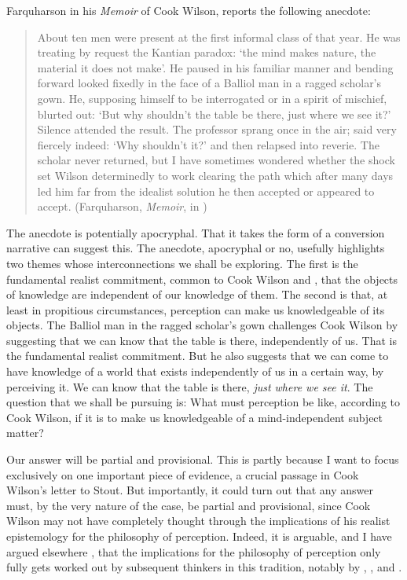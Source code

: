 \documentclass[12pt]{article}
\begin{document}
Farquharson in his \emph{Memoir} of Cook Wilson, reports the following anecdote:
\begin{quote}
	About ten men were present at the first informal class of that year. He was treating by request the Kantian paradox: `the mind makes nature, the material it does not make'. He paused in his familiar manner and bending forward looked fixedly in the face of a Balliol man in a ragged scholar's gown. He, supposing himself to be interrogated or in a spirit of mischief, blurted out: `But why shouldn't the table be there, just where we see it?' Silence attended the result. The professor sprang once in the air; said very fiercely indeed: `Why shouldn't it?' and then relapsed into reverie. The scholar never returned, but I have sometimes wondered whether the shock set Wilson determinedly to work clearing the path which after many days led him far from the idealist solution he then accepted or appeared to accept. (Farquharson, \emph{Memoir}, in \citealt[xix]{Cook-Wilson:1926sf})
\end{quote}
The anecdote is potentially apocryphal. That it takes the form of a conversion narrative can suggest this. The anecdote, apocryphal or no, usefully highlights two themes whose interconnections we shall be exploring. The first is the fundamental realist commitment, common to Cook Wilson and \citet{Moore:1903uo}, that the objects of knowledge are independent of our knowledge of them. The second is that, at least in propitious circumstances, perception can make us knowledgeable of its objects. The Balliol man in the ragged scholar's gown challenges Cook Wilson by suggesting that we can know that the table is there, independently of us. That is the fundamental realist commitment. But he also suggests that we can come to have knowledge of a world that exists independently of us in a certain way, by perceiving it. We can know that the table is there, \emph{just where we see it}. The question that we shall be pursuing is: What must perception be like, according to Cook Wilson, if it is to make us knowledgeable of a mind-independent subject matter? 

Our answer will be partial and provisional. This is partly because I want to focus exclusively on one important piece of evidence, a crucial passage in Cook Wilson's letter to Stout. But importantly, it could turn out that any answer must, by the very nature of the case, be partial and provisional, since Cook Wilson may not have completely thought through the implications of his realist epistemology for the philosophy of perception. Indeed, it is arguable, and I have argued elsewhere \citep{Kalderon:2010fk}, that the implications for the philosophy of perception only fully gets worked out by subsequent thinkers in this tradition, notably by \citet{Prichard:1938ve}, \citet{Austin:1962lr}, and \citet{Hinton:1973js}.
\end{document}
